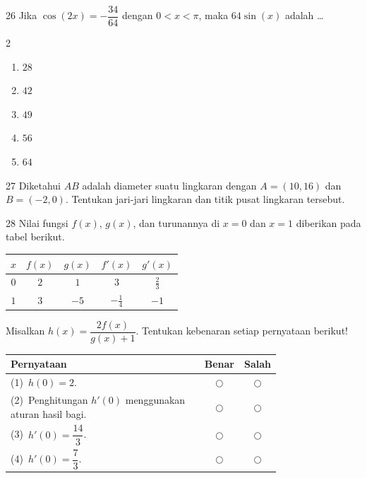 \documentclass[11pt]{article}
\newenvironment{pilB}{%
  \par\smallskip\begin{multicols}{2}
  \begin{enumerate}[label=(\Alph*),leftmargin=*,itemsep=1pt,topsep=3pt]}%
  {\end{enumerate}\end{multicols}}
\begin{document}
\begin{soal}{26}
Jika $\cos(2x)=-\dfrac{34}{64}$ dengan $0<x<\pi$,
maka $64\sin(x)$ adalah \ldots
\begin{pilB}
  \item $28$ \item $42$ \item $49$ \item $56$ \item $64$
\end{pilB}
\end{soal}

\begin{soal}{27}
Diketahui $AB$ adalah diameter suatu lingkaran dengan $A=(10,16)$
dan $B=(-2,0)$. Tentukan jari-jari lingkaran dan titik pusat
lingkaran tersebut.
\end{soal}

\begin{soal}{28}
Nilai fungsi $f(x)$, $g(x)$, dan turunannya di $x=0$ dan $x=1$
diberikan pada tabel berikut.
\begin{center}
\begin{tabular}{c|cccc}
$x$ & $f(x)$ & $g(x)$ & $f'(x)$ & $g'(x)$ \\
\hline
$0$ & $2$ & $1$ & $3$ & $\tfrac{2}{3}$ \\
$1$ & $3$ & $-5$ & $-\tfrac{1}{4}$ & $-1$ \\
\end{tabular}
\end{center}
Misalkan $h(x)=\dfrac{2f(x)}{g(x)+1}$.
Tentukan kebenaran setiap pernyataan berikut!

\par\smallskip
{\renewcommand{\arraystretch}{1.4}%
\begin{tabular}{@{}p{0.76\linewidth}cc@{}}
\hline
\textbf{Pernyataan} & \textbf{Benar} & \textbf{Salah}\\
\hline
(1)~$h(0)=2$.
  & $\bigcirc$ & $\bigcirc$\\
(2)~Penghitungan $h'(0)$ menggunakan aturan hasil bagi.
  & $\bigcirc$ & $\bigcirc$\\
(3)~$h'(0)=\dfrac{14}{3}$.
  & $\bigcirc$ & $\bigcirc$\\
(4)~$h'(0)=\dfrac{7}{3}$.
  & $\bigcirc$ & $\bigcirc$\\
\hline
\end{tabular}}
\end{soal}
\end{document}
